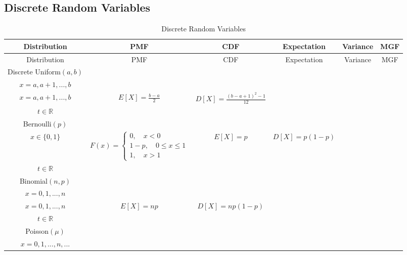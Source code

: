 		\begin{landscape}
		\section{Discrete Random Variables}
			\begin{longtable}[c]{|c|c|c|c|c|c|}
				\caption{Discrete Random Variables \label{DRV}}\\
				\hline
				Distribution & PMF & CDF & Expectation & Variance & MGF \\
				\hline
				\endfirsthead
				\hline
				Distribution & PMF & CDF & Expectation & Variance & MGF \\
				\hline
				\endhead
				Discrete Uniform$(a, b)$ & 
				\makecell{$f(x)=\frac1{b-a+1}$ \\ $x=a, a+1, ..., b$} & 
				\makecell{$F(x)=\frac{x-a+1}{b-a+1}$ \\ $x=a, a+1, ..., b$} & 
				$E[X]=\frac{b-a}{2}$ & 
				$D[X]=\frac{(b-a+1)^2-1}{12}$ & 
				\makecell{$M(t)=\frac{e^{at}-e^{(b+1)t}}{(b-a+1)(1-e^t)}$ \\ $t \in \mathbb{R}$} \\
				\hline
				Bernoulli$(p)$ & 
				\makecell{$f(x)=p^x(1-p)^{1-x}$ \\ $x \in \{0,1\}$} &
				$F(x)=\begin{cases}0, \quad x<0 \\ 
									1-p, \quad 0\le x \le 1 \\
									1, \quad x>1\end{cases}$ & 
				$E[X]=p$ & 
				$D[X]=p(1-p)$ & 
				\makecell{$M(t)=1-p+pe^{t}$ \\ $t\in \mathbb{R}$}\\
				\hline
				Binomial$(n, p)$ &
				\makecell{$f(x)=\left(\begin{matrix}n\\x\end{matrix}\right)p^x(1-p)^{n-x}$ \\ $x=0,1,...,n$} &
				\makecell{$F(x)=\sum_{k=0}^{x}\left(\begin{matrix}n\\k\end{matrix}\right)p^k(1-p)^{n-k}$ \\ $x=0,1,...,n$} &
				$E[X]=np$ &
				$D[X]=np(1-p)$ &
				\makecell{$M(t)=(1-p+pe^{t})^n$ \\ $t\in \mathbb{R}$}\\
				\hline
				Poisson$(\mu)$ &
				\makecell{$f(x)=\frac{\mu^xe^\mu}{x!}$ \\ $x = 0,1,...,n,...$} &

\end{longtable}
\end{landscape}
